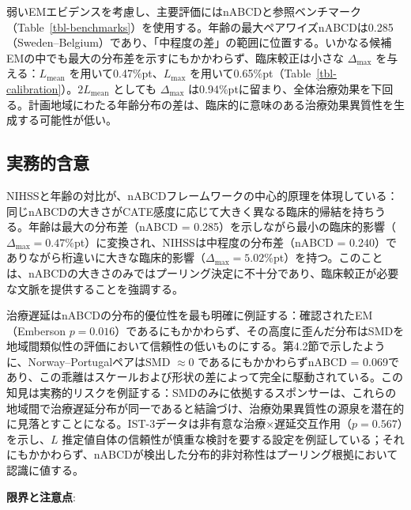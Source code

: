 \documentclass[
  a4paper,
  11pt]{ltjsarticle}
\begin{document}
弱いEMエビデンスを考慮し、主要評価にはnABCDと参照ベンチマーク（Table~\ref{tbl-benchmarks}）を使用する。年齢の最大ペアワイズnABCDは0.285（Sweden--Belgium）であり、「中程度の差」の範囲に位置する。いかなる候補EMの中でも最大の分布差を示すにもかかわらず、臨床較正は小さな
\(\Delta_{\max}\) を与える：\(L_{\text{mean}}\)
を用いて0.47\%pt、\(L_{\max}\)
を用いて0.65\%pt（Table~\ref{tbl-calibration}）。\(2 L_{\text{mean}}\)
としても \(\Delta_{\max}\)
は0.94\%ptに留まり、全体治療効果を下回る。計画地域にわたる年齢分布の差は、臨床的に意味のある治療効果異質性を生成する可能性が低い。

\subsection{実務的含意}\label{ux5b9fux52d9ux7684ux542bux610f}

NIHSSと年齢の対比が、nABCDフレームワークの中心的原理を体現している：同じnABCDの大きさがCATE感度に応じて大きく異なる臨床的帰結を持ちうる。年齢は最大の分布差（nABCD
=
0.285）を示しながら最小の臨床的影響（\(\Delta_{\max} = 0.47\)\%pt）に変換され、NIHSSは中程度の分布差（nABCD
=
0.240）でありながら桁違いに大きな臨床的影響（\(\Delta_{\max} = 5.02\)\%pt）を持つ。このことは、nABCDの大きさのみではプーリング決定に不十分であり、臨床較正が必要な文脈を提供することを強調する。

治療遅延はnABCDの分布的優位性を最も明確に例証する：確認されたEM（Emberson
\(p = 0.016\)）であるにもかかわらず、その高度に歪んだ分布はSMDを地域間類似性の評価において信頼性の低いものにする。第4.2節で示したように、Norway--PortugalペアはSMD
\(\approx 0\) であるにもかかわらずnABCD =
0.069であり、この乖離はスケールおよび形状の差によって完全に駆動されている。この知見は実務的リスクを例証する：SMDのみに依拠するスポンサーは、これらの地域間で治療遅延分布が同一であると結論づけ、治療効果異質性の源泉を潜在的に見落とすことになる。IST-3データは非有意な治療×遅延交互作用（\(p = 0.567\)）を示し、\(L\)
推定値自体の信頼性が慎重な検討を要する設定を例証している；それにもかかわらず、nABCDが検出した分布的非対称性はプーリング根拠において認識に値する。

\textbf{限界と注意点}:
\end{document}
